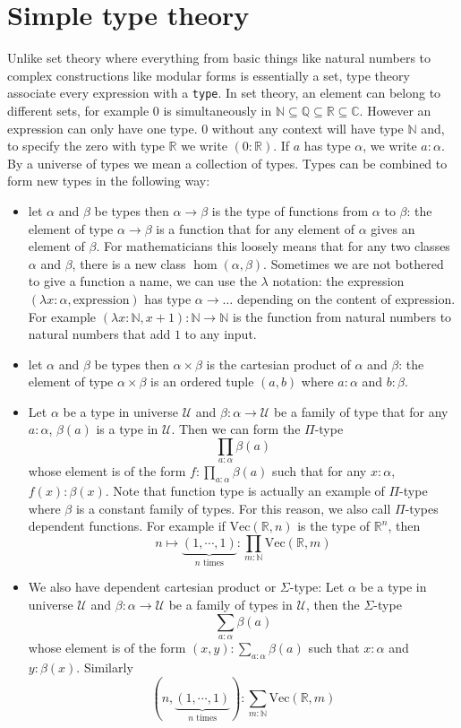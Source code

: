 \documentclass{report}
\theoremstyle{definition}
\begin{document}
\section{Simple type theory}
Unlike set theory where everything from basic things like natural numbers to complex constructions like modular forms is essentially a set, type theory associate every expression with a {\tt \small type}. In set theory, an element can belong to different sets, for example $0$ is simultaneously in $\mathbb N\subseteq\mathbb Q\subseteq\mathbb R\subseteq\mathbb C$. However an expression can only have one type. $0$ without any context will have type $\mathbb N$ and, to specify the zero with type $\mathbb R$ we write $(0:\mathbb R)$. If $a$ has type $\alpha$, we write $a:\alpha$. By a universe of types we mean a collection of types. Types can be combined to form new types in the following way:
\begin{itemize}
  \item let $\alpha$ and $\beta$ be types then $\alpha\to\beta$ is the type of functions from $\alpha$ to $\beta$: the element of type $\alpha\to\beta$ is a function that for any element of $\alpha$ gives an element of $\beta$. For mathematicians this loosely means that for any two classes $\alpha$ and $\beta$, there is a new class $\hom(\alpha,\beta)$. Sometimes we are not bothered to give a function a name, we can use the $\lambda$ notation: the expression $(\lambda x:\alpha, \text{expression})$ has type $\alpha\to\dots$ depending on the content of expression. For example $(\lambda x:\mathbb N, x+1):\mathbb{N}\to\mathbb{N}$ is the function from natural numbers to natural numbers that add $1$ to any input.
  \item let $\alpha$ and $\beta$ be types then $\alpha\times\beta$ is the cartesian product of $\alpha$ and $\beta$: the element of type $\alpha\times\beta$ is an ordered tuple $(a,b)$ where $a:\alpha$ and $b:\beta$.
  \item Let $\alpha$ be a type in universe $\mathcal U$ and $\beta:\alpha\to\mathcal U$ be a family of type that for any $a:\alpha$, $\beta(a)$ is a type in $\mathcal U$. Then we can form the $\Pi$-type $$\prod_{a:\alpha}\beta(a)$$ whose element is of the form $f:\prod_{a:\alpha}\beta(a)$ such that for any $x:\alpha$, $f(x):\beta(x)$. Note that function type is actually an example of $\Pi$-type where $\beta$ is a constant family of types. For this reason, we also call $\Pi$-types dependent functions. For example if $\mathrm{Vec}(\mathbb{R},n)$ is the type of $\mathbb R^n$, then 
    $$n\mapsto\underbrace{(1,\cdots,1)}_{n\text{ times}}:\prod_{m:\mathbb N} \mathrm{Vec}(\mathbb R, m)$$
  \item We also have dependent cartesian product or $\Sigma$-type: Let $\alpha$ be a type in universe $\mathcal U$ and $\beta:\alpha\to\mathcal U$ be a family of types in $\mathcal U$, then the $\Sigma$-type $$\sum_{a:\alpha}\beta(a)$$ whose element is of the form $(x,y):\sum_{a:\alpha}\beta(a)$ such that $x:\alpha$ and $y:\beta(x)$. Similarly $$\left(n,\underbrace{(1,\cdots,1)}_{n\text{ times}}\right):\sum_{m:\mathbb N} \mathrm{Vec}(\mathbb R, m)$$
\end{itemize}
\end{document}
